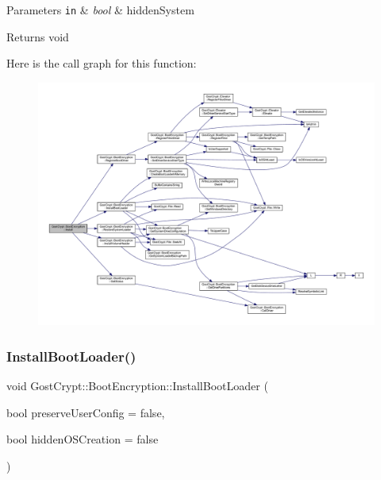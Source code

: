 \begin{DoxyParams}[1]{Parameters}
\mbox{\tt in}  & {\em bool} & hidden\+System \\
\hline
\end{DoxyParams}
\begin{DoxyReturn}{Returns}
void 
\end{DoxyReturn}
Here is the call graph for this function\+:
\nopagebreak
\begin{figure}[H]
\begin{center}
\leavevmode
\includegraphics[width=350pt]{class_gost_crypt_1_1_boot_encryption_afae7ad7d8fb9fb9137395cb5e378a849_cgraph}
\end{center}
\end{figure}
\mbox{\label{class_gost_crypt_1_1_boot_encryption_abcddd955b7fa53811e74c7298d34268b}} 
\subsubsection{\texorpdfstring{Install\+Boot\+Loader()}{InstallBootLoader()}}
{\footnotesize\ttfamily void Gost\+Crypt\+::\+Boot\+Encryption\+::\+Install\+Boot\+Loader (\begin{DoxyParamCaption}\item[{bool}]{preserve\+User\+Config = {\ttfamily false},  }\item[{bool}]{hidden\+O\+S\+Creation = {\ttfamily false} }\end{DoxyParamCaption})}



